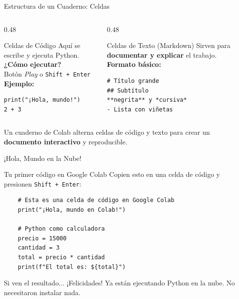 \documentclass[aspectratio=169]{beamer}
\newcommand{\tech}[1]{\texttt{\textcolor{mainColor}{#1}}}
\begin{document}
\begin{frame}[fragile]{Estructura de un Cuaderno: Celdas}
  \begin{columns}[T]
    \begin{column}{0.48\textwidth}
      \begin{conceptbox}{\faCode\enspace Celdas de Código}
        \small
        Aquí se escribe y ejecuta Python.\\[4pt]
        \textbf{¿Cómo ejecutar?}\\
        Botón \textit{Play} o \tech{Shift + Enter}\\[4pt]
        \textbf{Ejemplo:}
\begin{verbatim}
print("¡Hola, mundo!")
2 + 3
\end{verbatim}
      \end{conceptbox}
    \end{column}
    \begin{column}{0.48\textwidth}
      \begin{conceptbox}{\faFileAlt\enspace Celdas de Texto (Markdown)}
        \small
        Sirven para \textbf{documentar y explicar} el trabajo.\\[4pt]
        \textbf{Formato básico:}
\begin{verbatim}
# Título grande
## Subtítulo
**negrita** y *cursiva*
- Lista con viñetas
\end{verbatim}
      \end{conceptbox}
    \end{column}
  \end{columns}
  \vspace{0.2cm}
  \centering\small
  Un cuaderno de Colab alterna celdas de código y texto para crear
  un \textbf{documento interactivo} y reproducible.
\end{frame}

\begin{frame}[fragile]{¡Hola, Mundo en la Nube!}
  \begin{block}{\faPython\enspace Tu primer código en Google Colab}
    \small Copien esto en una celda de código y presionen \tech{Shift + Enter}:
  \end{block}
  \vspace{0.2cm}
\begin{verbatim}
    # Esta es una celda de código en Google Colab
    print("¡Hola, mundo en Colab!")

    # Python como calculadora
    precio = 15000
    cantidad = 3
    total = precio * cantidad
    print(f"El total es: ${total}")
\end{verbatim}
  \vspace{0.2cm}
  \begin{alertblock}{\faCheckCircle\enspace Si ven el resultado...}
    \centering\small
    ¡Felicidades! Ya están ejecutando Python en la nube.
    No necesitaron instalar nada.
  \end{alertblock}
\end{frame}
\end{document}

